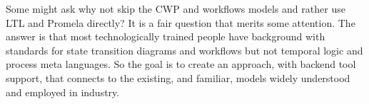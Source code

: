 Some might ask why not skip the CWP and workflows models and rather use LTL and Promela directly? It is a fair question that merits some attention. The answer is that most technologically trained people have background with standards for state transition diagrams and workflows but not temporal logic and process meta languages. So the goal is to create an approach, with backend tool support, that connects to the existing, and familiar, models widely understood and employed in industry. 